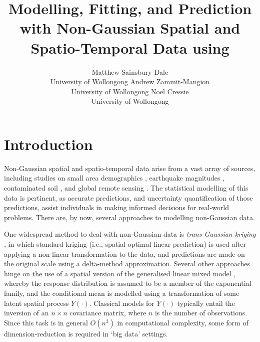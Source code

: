 \documentclass[nojss]{jss}
\author{Matthew Sainsbury-Dale\\University of Wollongong
   \And \quad\quad Andrew Zammit-Mangion\\\quad\quad University of Wollongong 
   \And Noel Cressie\\University of Wollongong}
\title{Modelling, Fitting, and Prediction with Non-Gaussian Spatial and Spatio-Temporal Data using %
\pkg{FRK}}
\begin{document}
\sloppy %

\section{Introduction}\label{sec:intro}

 Non-Gaussian spatial and spatio-temporal data arise from a vast array of sources, including studies on small area demographics \citep{Bradley_2016_Bayesian_spatial_COS_lattice_data}, earthquake magnitudes \citep{Hu_2018_log-gamma_earthquake_magnitudes}, contaminated soil \citep{Paul_Cressie_2011_lognormal_kriging_block_prediction}, and global remote sensing  \citep{Sengupta_2016_MODIS}.  
 The statistical modelling of this data is pertinent, as accurate predictions, and uncertainty quantification of those predictions, assist individuals in making informed decisions for real-world problems. 
 There are, by now, several approaches to modelling non-Gaussian data. 


One widespread method to deal with non-Gaussian data is \textit{trans-Gaussian kriging} \citep[pg.~137--138]{Cressie_1993_stats_for_spatial_data}, in which standard kriging (i.e., spatial optimal linear prediction) is used after applying a non-linear transformation to the data, and predictions are made on the original scale using a delta-method approximation. 
Several other approaches hinge on the use of a spatial version of the generalised linear mixed model \citep[GLMM;][]{Diggle_1998_spatial_GLMM}, whereby the response distribution is assumed to be a member of the exponential family, and the conditional mean is modelled using a transformation of some latent spatial process $Y(\cdot)$. 
 Classical %
 models for $Y(\cdot)$ typically entail the inversion of an $n\times n$ covariance matrix, where $n$ is the number of observations. 
 Since this task is in general $O(n^3)$ in computational complexity, some form of dimension-reduction is required in `big data' settings. 
 
\end{document}
